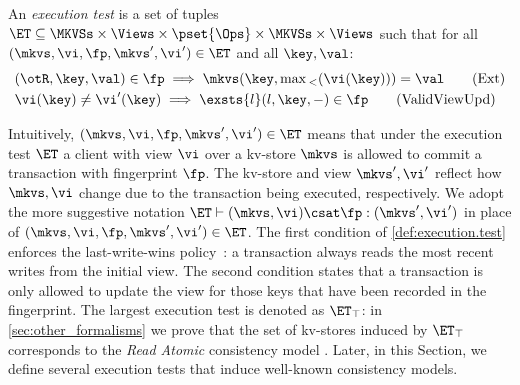 
\begin{definition}
\label{def:execution.test}
An \emph{execution test} is a set of tuples $\ET \subseteq \MKVSs \times \Views \times \pset{\Ops} \times \MKVSs \times \Views$ 
such that for all $(\mkvs, \vi, \fp, \mkvs', \vi') \in \ET$ and all $\key, \val$:
%
{%
\begin{align}
\small
    & 
	(\otR, \key, \val) \in \fp \implies
	\mkvs(\key, \max{}_{<}(\vi(\key))) = \val  
	\tag{Ext} \label{eq:read-external} \\
    & 
    \vi(\key) \neq \vi'(\key) 
    \implies
    \exsts{l} (l, \key, -) \in \fp
    \tag{ValidViewUpd} \label{eq:valid-view-update}
\end{align}%
}%
\end{definition}
%
\noindent 
Intuitively, $(\mkvs, \vi, \fp, \mkvs', \vi') \in \ET$ means that under the execution test $\ET$ 
a client with view $\vi$ over a kv-store $\mkvs$ is allowed to commit a transaction with 
fingerprint $\fp$. The kv-store and view $\mkvs', \vi'$ reflect how $\mkvs, \vi$ change due 
to the transaction being executed, respectively. We adopt the more suggestive notation 
$\ET \vdash (\mkvs, \vi) \csat \fp: (\mkvs', \vi')$ in place of $(\mkvs, \vi, \fp, \mkvs', \vi') \in \ET$.
The first condition of \cref{def:execution.test} enforces the last-write-wins policy~\cite{vogels:2009:ec:1435417.1435432}: 
a transaction always reads the most recent writes from the initial view.  
The second condition states that a transaction is only allowed to update the view for those keys 
that have been recorded in the fingerprint.  The largest execution test is denoted as $\ET_{\top}$: 
in \cref{sec:other_formalisms} we prove that the set of kv-stores induced by $\ET_{\top}$ 
corresponds to the \emph{Read Atomic} consistency model \cite{ramp}. Later, in this Section, 
we define several execution tests that induce well-known consistency models.


